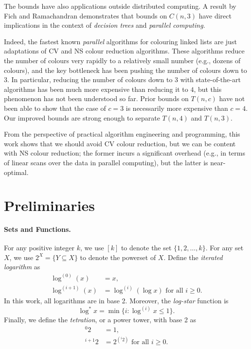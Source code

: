 \documentclass[a4paper,11pt]{article}
\theoremstyle{remark}
\newcommand{\logst}{\log^{*}}
\newcommand{\pt}[1]{{}^{#1}2} \newcommand{\nh}{\sim} \DeclareMathOperator{\indeg}{in-deg}
\begin{document}
The bounds have also applications outside distributed computing. A result by Fich and Ramachandran \cite{fich90linkedlists} demonstrates that bounds on $C(n,3)$ have direct implications in the context of \emph{decision trees} and \emph{parallel computing}.

Indeed, the fastest known \emph{parallel} algorithms for colouring linked lists are just adaptations of CV and NS colour reduction algorithms. These algorithms reduce the number of colours very rapidly to a relatively small number (e.g., dozens of colours), and the key bottleneck has been pushing the number of colours down to $3$. In particular, reducing the number of colours down to $3$ with state-of-the-art algorithms has been much more expensive than reducing it to $4$, but this phenomenon has not been understood so far. Prior bounds on $T(n,c)$ have not been able to show that the case of $c = 3$ is necessarily more expensive than $c = 4$. Our improved bounds are strong enough to separate $T(n,4)$ and $T(n,3)$.

From the perspective of practical algorithm engineering and programming, this work shows that we should avoid CV colour reduction, but we can be content with NS colour reduction; the former incurs a significant overhead (e.g., in terms of linear scans over the data in parallel computing), but the latter is near-optimal.

\section{Preliminaries}

\paragraph{Sets and Functions.} For any positive integer $k$, we use $[k]$ to denote the set $\{1, 2, \dots, k\}$. For any set $X$, we use $2^{X} = \{ Y \subseteq X \}$ to denote the powerset of $X$. Define the \emph{iterated logarithm} as
\begin{align*}
 \log^{(0)}(x) &= x, \\
 \log^{(i+1)}(x) &= \log^{(i)}( \log x ) \textrm{ for all } i \ge 0.
\end{align*}
In this work, all logarithms are in base 2. 
Moreover, the \emph{log-star} function is
\[
 \logst x = \min \{ i : \log^{(i)} x \le 1 \}.
\]
Finally, we define the \emph{tetration}, or a power tower, with base 2 as 
\begin{align*}
 \pt{0} &= 1, \\
 \pt{i+1} &= 2^{\left(\pt{i} \right)} \textrm{ for all } i \ge 0.
\end{align*}
\end{document}
